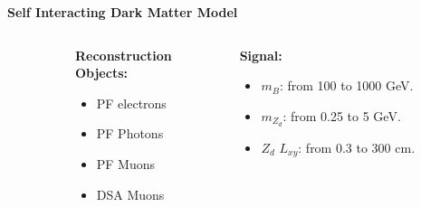 \documentclass{beamer}
\begin{document}
\begin{frame}[t]{\textbf{Self Interacting Dark Matter Model}}
\begin{columns}
\begin{column}{.4\textwidth}
    \end{column}
    
    \begin{column}{.3\textwidth}
    \centering
    \textbf{\textcolor{peacockblue}{Reconstruction \\
    Objects:}}
    \begin{itemize}
        \item PF electrons
         \item PF Photons
         \item PF Muons
         \item DSA Muons
    \end{itemize}
        
    \end{column}
    \begin{column}{.3\textwidth}
    \centering
    \textbf{\textcolor{peacockblue}{Signal:}}
    \begin{itemize}
        \item   $m_B$: from 100 to 1000 GeV.
         \item $m_{Z_d}$: from 0.25 to 5 GeV.
         \item $Z_d$ $L_{xy}$: from 0.3 to 300 cm.
    \end{itemize}
    \end{column}
    \end{columns}
    \end{frame}
\end{document}
